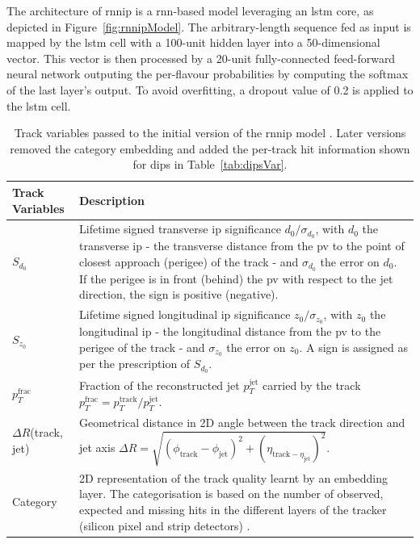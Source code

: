 The architecture of \gls{rnnip} is a \gls{rnn}-based model leveraging an \gls{lstm} core, as depicted in Figure~\ref{fig:rnnipModel}. The arbitrary-length sequence fed as input is mapped by the \gls{lstm} cell with a 100-unit hidden layer into a 50-dimensional vector. This vector is then processed by a 20-unit fully-connected feed-forward neural network outputing the per-flavour probabilities by computing the softmax of the last layer's output. To avoid overfitting, a dropout value of 0.2 is applied to the \gls{lstm} cell. 

\begin{table}[h]
  \begin{center}
      \begin{tabular}{C{3cm}|C{13cm}} 
      	 \hline \hline
          Track Variables & Description  \\ \hline \hline
          $S_{d_0}$      & Lifetime signed transverse \gls{ip} significance $d_0 / \sigma_{d_0}$, with $d_0$ the transverse \gls{ip} - the transverse distance from the \gls{pv} to the point of closest approach (perigee) of the track - and $\sigma_{d_0}$ the error on $d_0$. If the perigee is in front (behind) the \gls{pv} with respect to the jet direction, the sign is positive (negative). \\ \hline
          $S_{z_0}$      & Lifetime signed longitudinal \gls{ip} significance $z_0 / \sigma_{z_0}$, with $z_0$ the longitudinal \gls{ip} - the longitudinal distance from the \gls{pv} to the perigee of the track - and $\sigma_{z_0}$ the error on $z_0$. A sign is assigned as per the prescription of $S_{d_0}$. \\ \hline
          $p_T^{\textrm{frac}}$   & Fraction of the reconstructed jet $p_T^{\textrm{jet}}$ carried by the track $p_T^{\textrm{frac}} = p_T^{\textrm{track}} / p_T^{\textrm{jet}}$. \\ \hline
          $\Delta R$(track, jet) & Geometrical distance in 2D angle between the track direction and jet axis $\Delta R = \sqrt{(\phi_{\textrm{track}} - \phi_{\textrm{jet}})^2 + (\eta_{\textrm{track} - \eta_{\textrm{jet}}})^2}$. \\ \hline
          Category       & 2D representation of the track quality learnt by an embedding layer. The categorisation is based on the number of observed, expected and missing hits in the different layers of the tracker (silicon pixel and strip detectors) \cite{ATL-PHYS-PUB-2015-022}.  \\ \hline
      \end{tabular}
    \caption{Track variables passed to the initial version of the \gls{rnnip} model \cite{ATL-PHYS-PUB-2017-003}. Later versions removed the category embedding and added the per-track hit information shown for \gls{dips} in Table~\ref{tab:dipsVar}.}
    \label{tab:rnnipVar}
  \end{center}
\end{table}

